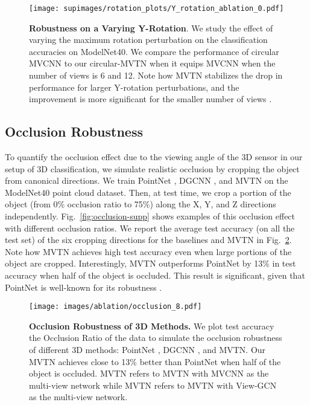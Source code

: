\documentclass[10pt,twocolumn,letterpaper]{article}
\newcommand{\figLabel}{Fig.~}
\begin{document}
\begin{figure}[ht]
    \centering
    \texttt{[image: supimages/rotation\_plots/Y\_rotation\_ablation\_0.pdf]}
    \caption{\textbf{Robustness on a Varying Y-Rotation}. We study the effect of varying the maximum rotation perturbation on the classification accuracies on ModelNet40. We compare the performance of circular MVCNN \cite{mvcnn} to our circular-MVTN when it equips MVCNN when the number of views is 6 and 12. Note how MVTN stabilizes the drop in performance for larger Y-rotation perturbations, and the improvement is more significant for the smaller number of views .}
    \label{fig:y-robustness-ablate-sup}
\end{figure}

\subsection{Occlusion Robustness} \label{sec:occlusion-supp}
To quantify the occlusion effect due to the viewing angle of the 3D sensor in our setup of 3D classification, we simulate realistic occlusion by cropping the object from canonical directions. We train PointNet \cite{pointnet}, DGCNN \cite{dgcn}, and MVTN on the ModelNet40 point cloud dataset. Then, at test time, we crop a portion of the object (from 0\% occlusion ratio to 75\%) along the X, Y, and Z directions independently. \figLabel{\ref{fig:occlusion-supp}} shows examples of this occlusion effect with different occlusion ratios. We report the average test accuracy (on all the test set) of the six cropping directions for the baselines and MVTN in \figLabel{\ref{fig:occlusion}}. Note how MVTN achieves high test accuracy even when large portions of the object are cropped. Interestingly, MVTN outperforms PointNet \cite{pointnet} by 13\% in test accuracy when half of the object is occluded. This result is significant, given that PointNet is well-known for its robustness \cite{pointnet,advpc}. 
\begin{figure}[t]
    \centering
    \texttt{[image: images/ablation/occlusion\_8.pdf]}
    \caption{\textbf{Occlusion Robustness of 3D Methods.} We plot test accuracy \vs the Occlusion Ratio of the data to simulate the occlusion robustness of different 3D methods: PointNet \cite{pointnet}, DGCNN \cite{dgcn}, and MVTN. Our MVTN achieves close to 13\% better than PointNet when half of the object is occluded. MVTN refers to MVTN with MVCNN as the multi-view network while MVTN refers to MVTN with View-GCN as the multi-view network.}
    \label{fig:occlusion}
\end{figure}
\end{document}
